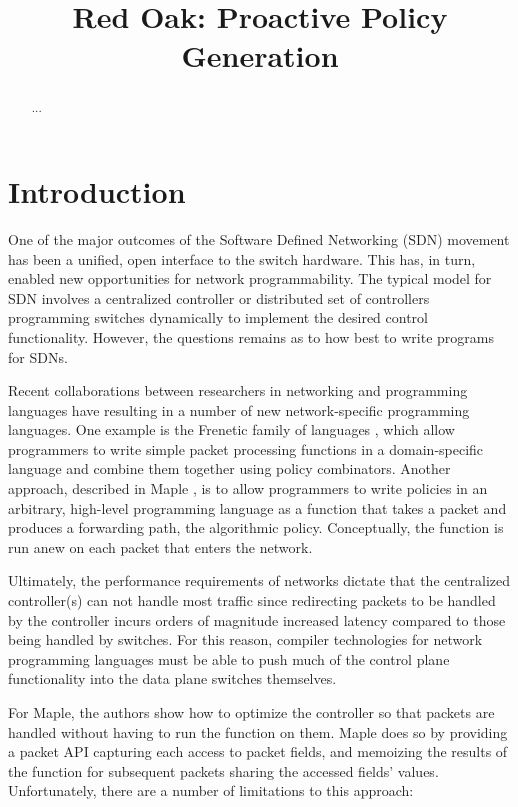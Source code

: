 \documentclass[preprint]{sigplanconf}
\title{Red Oak: Proactive Policy Generation}
\begin{document}
\maketitle

\begin{abstract} ...
\end{abstract}

\section*{Introduction}

One of the major outcomes of the Software Defined Networking (SDN) movement has been a unified, open interface to the switch hardware. This has, in turn, enabled new opportunities for network programmability. The typical model for SDN involves a centralized controller or distributed set of controllers programming switches dynamically to implement the desired control functionality.
However, the questions remains as to how best to write programs for SDNs.

Recent collaborations between researchers in networking and programming languages have resulting in a number of new network-specific programming languages. One example is the Frenetic family of languages \cite{Frenetic}, which allow programmers to write simple packet processing functions in a domain-specific language and combine them together using policy combinators. Another approach, described in Maple \cite{Maple}, is to allow programmers to write policies in an arbitrary, high-level programming language as a function that takes a packet and produces a forwarding path, the algorithmic policy. Conceptually, the function is run anew on each packet that enters the network.

Ultimately, the performance requirements of networks dictate that the centralized controller(s) can not handle most traffic since redirecting packets to be handled by the controller incurs orders of magnitude increased latency compared to those being handled by switches. For this reason, compiler technologies for network programming languages must be able to push much of the control plane functionality into the data plane switches themselves. 

For Maple, the authors show how to optimize the controller so that packets are handled without having to run the function on them. Maple does so by providing a packet API capturing each access to packet fields, and memoizing the results of the function for subsequent packets sharing the accessed fields' values. Unfortunately, there are a number of limitations to this approach:
\end{document}
